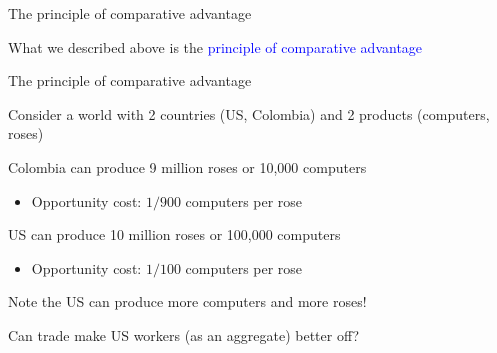 \documentclass[notes,11pt, aspectratio=169, xcolor=table]{beamer}
\newenvironment{wideitemize}{\itemize\addtolength{\itemsep}{10pt}}{\enditemize}
\begin{document}
\begin{frame}{The principle of comparative advantage}
    \begin{wideitemize} 
        \item What we described above is the \textcolor{blue}{principle of comparative advantage}
    \end{wideitemize}
\vspace{24pt}
\end{frame}

\begin{frame}{The principle of comparative advantage}
    \begin{wideitemize} 
        \item Consider a world with 2 countries (US, Colombia) and 2 products (computers, roses)
        \item<2-> Colombia can produce 9 million roses or 10,000 computers
        \begin{itemize}
            \item Opportunity cost: $1/900$ computers per rose
        \end{itemize}
        \item<3-> US can produce 10 million roses or 100,000 computers
        \begin{itemize}
            \item Opportunity cost: $1/100$ computers per rose
        \end{itemize}
        \item<4-> Note the US can produce more computers and more roses!
        \item<5-> Can trade make US workers (as an aggregate) better off?
    \end{wideitemize}
\end{frame}
\end{document}
